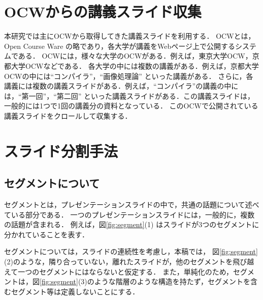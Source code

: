 \documentclass{js}
\begin{document}

\section{OCWからの講義スライド収集}

本研究では主にOCWから取得してきた講義スライドを利用する．
OCWとは，Open Course Ware の略であり，各大学が講義をWebページ上で公開するシステムである．
OCWには，様々な大学のOCWがある．例えば，東京大学OCW，京都大学OCWなどである．
各大学の中には複数の講義がある．例えば，京都大学OCWの中には``コンパイラ''，``画像処理論'' といった講義がある．
さらに，各講義には複数の講義スライドがある．例えば，``コンパイラ''の講義の中には，``第一回''，``第二回'' といった講義スライドがある．この講義スライドは，一般的には1つで1回の講義分の資料となっている．
このOCWで公開されている講義スライドをクロールして収集する．





\section{スライド分割手法}

\subsection{セグメントについて}

セグメントとは，プレゼンテーションスライドの中で，共通の話題について述べている部分である．
一つのプレゼンテーションスライドには，一般的に，複数の話題が含まれる．
例えば，図\ref{fig:segment}(1) はスライドが3つのセグメントに分かれていることを表す．

セグメントについては，スライドの連続性を考慮し，本稿では，
図\ref{fig:segment}(2)のような，隣り合っていない，離れたスライドが，他のセグメントを飛び越えて一つのセグメントにはならないと仮定する．
また，単純化のため，セグメントは，図\ref{fig:segment}(3)のような階層のような構造を持たず，セグメントを含むセグメント等は定義しないことにする．
\end{document}
